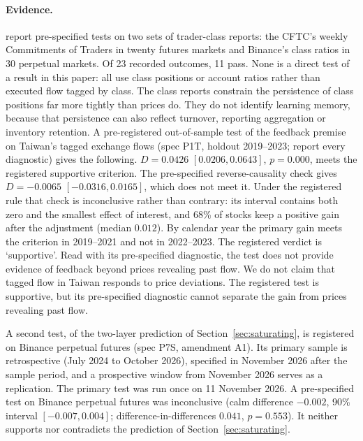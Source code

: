 \documentclass[12pt]{article}
\theoremstyle{definition}
\theoremstyle{remark}
\begin{document}
\paragraph{Evidence.} \citet{niroula2026a} report pre-specified tests on two sets of trader-class reports: the CFTC's weekly Commitments of Traders in twenty futures markets and Binance's class ratios in 30 perpetual markets. Of 23 recorded outcomes, 11 pass. None is a direct test of a result in this paper: all use class positions or account ratios rather than executed flow tagged by class. The class reports constrain the persistence of class positions far more tightly than prices do. They do not identify learning memory, because that persistence can also reflect turnover, reporting aggregation or inventory retention. A pre-registered out-of-sample test of the feedback premise on Taiwan's tagged exchange flows (spec P1T, holdout 2019--2023; \citet{niroula2026a} report every diagnostic) gives the following. $D=0.0426$ $[0.0206, 0.0643]$, $p=0.000$, meets the registered supportive criterion. The pre-specified reverse-causality check gives $D=-0.0065$ $[-0.0316, 0.0165]$, which does not meet it. Under the registered rule that check is inconclusive rather than contrary: its interval contains both zero and the smallest effect of interest, and 68\% of stocks keep a positive gain after the adjustment (median $0.012$). By calendar year the primary gain meets the criterion in 2019--2021 and not in 2022--2023. The registered verdict is `supportive'. Read with its pre-specified diagnostic, the test does not provide evidence of feedback beyond prices revealing past flow. We do not claim that tagged flow in Taiwan responds to price deviations. The registered test is supportive, but its pre-specified diagnostic cannot separate the gain from prices revealing past flow.

A second test, of the two-layer prediction of Section~\ref{sec:saturating}, is registered on Binance perpetual futures (spec P7S, amendment A1). Its primary sample is retrospective (July 2024 to October 2026), specified in November 2026 after the sample period, and a prospective window from November 2026 serves as a replication. The primary test was run once on 11 November 2026. A pre-specified test on Binance perpetual futures was inconclusive (calm difference $-0.002$, 90\% interval $[-0.007, 0.004]$; difference-in-differences $0.041$, $p=0.553$). It neither supports nor contradicts the prediction of Section~\ref{sec:saturating}.
\end{document}
